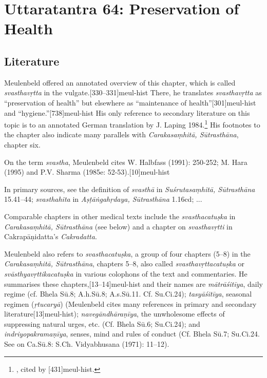 
\chapter{Uttaratantra 64: Preservation of Health}%

\section{Literature}

Meulenbeld offered an annotated overview of this chapter, which is called 
\emph{svasthavṛtta} in the vulgate.[330--331]{meul-hist} There, 
he translates \emph{svasthavṛtta} as ``preservation of health'' but elsewhere 
as ``maintenance of health''[301]{meul-hist} and 
``hygiene.''[738]{meul-hist} His only reference to secondary 
literature on this topic is to an annotated German translation by J. Laping 
1984.\footnote{\cite{lapi-1984}, cited by [431]{meul-hist}.} His 
footnotes to the chapter also indicate 
many parallels with \emph{Carakasaṃhitā, Sūtrasthāna}, chapter six.

On the term \emph{svastha}, Meulenbeld cites W. Halbfass (1991): 250-252; M. 
Hara (1995) and P.V. Sharma (1985e: 52-53).[10]{meul-hist}

In primary sources, see the definition of \emph{svasthā} in 
\emph{Suśrutasaṃhitā, Sūtrasthāna} 15.41--44; \emph{svasthahita} in 
\emph{Aṣṭāṅgahṛdaya, Sūtrasthāna} 1.16cd; ...

Comparable chapters in other medical texts include the \emph{svasthacatuṣka} 
in \emph{Carakasaṃhitā, Sūtrasthāna} (see below) and a chapter on 
\emph{svasthavṛtti} in Cakrapāṇidatta's \emph{Cakradatta}.

Meulenbeld also refers to \emph{svasthacatuṣka}, a group of four chapters 
(5--8) in the \emph{Carakasaṃhitā, Sūtrasthāna}, chapters 5–8, also called 
\emph{svasthavṛttacatuṣka} or \emph{svāsthyavṛttikacatuṣka} in various 
colophons of the text and commentaries. He summarises these 
chapters,[13--14]{meul-hist} and their names are 
\emph{mātrāśitīya}, daily regime (cf. Bhela Sū.8; A.h.Sū.8; A.s.Sū.11. Cf. 
Su.Ci.24); \emph{tasyāśitīya}, seasonal regimen (\emph{ṛtucaryā}) 
(Meulenbeld cites many references in primary and secondary 
literature[13]{meul-hist}); \emph{navegāndhāraṇīya}, the 
unwholesome effects of suppressing natural urges, etc. (Cf. Bhela Sū.6; 
Su.Ci.24); and \emph{indriyopakramaṇīya}, senses, mind and rules of conduct 
(Cf. Bhela Sū.7; Su.Ci.24. See on Ca.Sū.8: S.Ch. Vidyabhusana (1971): 11--12).

